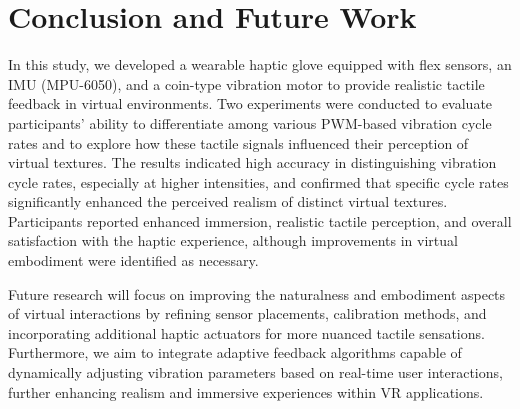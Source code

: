 \documentclass[graybox]{svmult}
\begin{document}

\section{Conclusion and Future Work}

In this study, we developed a wearable haptic glove equipped with flex sensors, an IMU (MPU-6050), and a coin-type vibration motor to provide realistic tactile feedback in virtual environments. Two experiments were conducted to evaluate participants' ability to differentiate among various PWM-based vibration cycle rates and to explore how these tactile signals influenced their perception of virtual textures. The results indicated high accuracy in distinguishing vibration cycle rates, especially at higher intensities, and confirmed that specific cycle rates significantly enhanced the perceived realism of distinct virtual textures. Participants reported enhanced immersion, realistic tactile perception, and overall satisfaction with the haptic experience, although improvements in virtual embodiment were identified as necessary.

Future research will focus on improving the naturalness and embodiment aspects of virtual interactions by refining sensor placements, calibration methods, and incorporating additional haptic actuators for more nuanced tactile sensations. Furthermore, we aim to integrate adaptive feedback algorithms capable of dynamically adjusting vibration parameters based on real-time user interactions, further enhancing realism and immersive experiences within VR applications.



%
%
%
%

%


\end{document}
